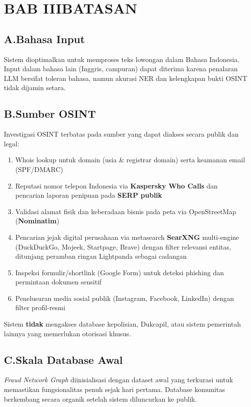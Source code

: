 \documentclass[12pt,a4paper]{article}
\begin{document}
\section*{BAB III\quad BATASAN}

\subsection*{A.\quad Bahasa Input}
Sistem dioptimalkan untuk memproses teks lowongan dalam Bahasa Indonesia. Input dalam bahasa
lain (Inggris, campuran) dapat diterima karena penalaran LLM bersifat toleran
bahasa, namun akurasi NER dan kelengkapan bukti OSINT tidak dijamin setara.

\subsection*{B.\quad Sumber OSINT}
Investigasi OSINT terbatas pada sumber yang dapat diakses secara publik dan legal:
\begin{enumerate}[label=\textbf{\arabic*.}]
  \item Whois lookup untuk domain (usia \& registrar domain) serta keamanan email (SPF/DMARC)
  \item Reputasi nomor telepon Indonesia via \textbf{Kaspersky Who Calls} dan pencarian
        laporan penipuan pada \textbf{SERP publik}
  \item Validasi alamat fisik dan keberadaan bisnis pada peta via OpenStreetMap (\textbf{Nominatim})
  \item Pencarian jejak digital perusahaan via metasearch \textbf{SearXNG} multi-engine
        (DuckDuckGo, Mojeek, Startpage, Brave) dengan filter relevansi entitas, ditunjang
        peramban ringan Lightpanda sebagai cadangan
  \item Inspeksi formulir/shortlink (Google Form) untuk deteksi phishing dan permintaan dokumen sensitif
  \item Penelusuran media sosial publik (Instagram, Facebook, LinkedIn) dengan filter profil-resmi
\end{enumerate}
Sistem \textbf{tidak} mengakses database kepolisian, Dukcapil, atau sistem pemerintah lainnya
yang memerlukan otorisasi khusus.

\subsection*{C.\quad Skala Database Awal}
\textit{Fraud Network Graph} diinisialisasi dengan dataset awal yang terkurasi untuk memastikan
fungsionalitas penuh sejak hari pertama. Database komunitas berkembang secara organik setelah
sistem diluncurkan ke publik.
\end{document}
